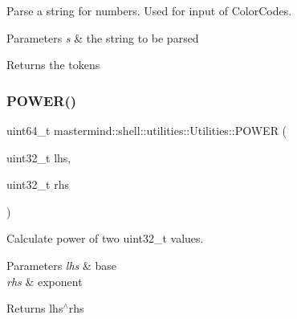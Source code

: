 Parse a string for numbers. Used for input of Color\+Codes. 


\begin{DoxyParams}{Parameters}
{\em s} & the string to be parsed \\
\hline
\end{DoxyParams}
\begin{DoxyReturn}{Returns}
the tokens 
\end{DoxyReturn}
\hypertarget{classmastermind_1_1shell_1_1utilities_1_1_utilities_a890a9c41f6a4a13419fb6a7e456bfc4f}{}\label{classmastermind_1_1shell_1_1utilities_1_1_utilities_a890a9c41f6a4a13419fb6a7e456bfc4f} 
\subsubsection{\texorpdfstring{P\+O\+W\+E\+R()}{POWER()}}
{\footnotesize\ttfamily uint64\+\_\+t mastermind\+::shell\+::utilities\+::\+Utilities\+::\+P\+O\+W\+ER (\begin{DoxyParamCaption}\item[{uint32\+\_\+t}]{lhs,  }\item[{uint32\+\_\+t}]{rhs }\end{DoxyParamCaption})\hspace{0.3cm}{\ttfamily [static]}}



Calculate power of two uint32\+\_\+t values. 


\begin{DoxyParams}{Parameters}
{\em lhs} & base \\
\hline
{\em rhs} & exponent \\
\hline
\end{DoxyParams}
\begin{DoxyReturn}{Returns}
lhs$^\wedge$rhs 
\end{DoxyReturn}
\hypertarget{classmastermind_1_1shell_1_1utilities_1_1_utilities_a9676baba3bcb2d508ccedce50f466a9c}{}\label{classmastermind_1_1shell_1_1utilities_1_1_utilities_a9676baba3bcb2d508ccedce50f466a9c} 
